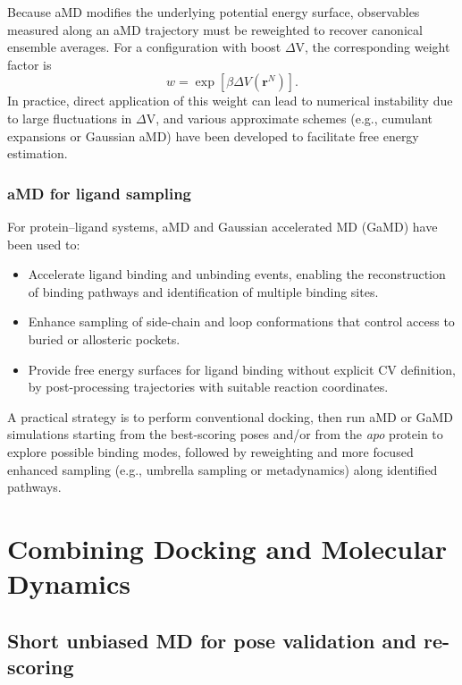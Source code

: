\documentclass[12pt]{article}
\begin{document}
Because aMD modifies the underlying potential energy surface, observables measured along an aMD trajectory must be reweighted to recover canonical ensemble averages. For a configuration with boost $\Delta \textrm{V}$, the corresponding weight factor is
\begin{equation}
w = \exp\left[\beta \Delta V(\mathbf{r}^N)\right].
\end{equation}
In practice, direct application of this weight can lead to numerical instability due to large fluctuations in $\Delta \textrm{V}$, and various approximate schemes (e.g., cumulant expansions or Gaussian aMD) have been developed to facilitate free energy estimation\cite{CH9_Miao2015}.

\subsubsection{aMD for ligand sampling}

For protein--ligand systems, aMD and Gaussian accelerated MD (GaMD)\cite{CH9_Miao2015,CH9_Markwick2011} have been used to:

\begin{itemize}
\item Accelerate ligand binding and unbinding events, enabling the reconstruction of binding pathways and identification of multiple binding sites.
\item Enhance sampling of side-chain and loop conformations that control access to buried or allosteric pockets.
\item Provide free energy surfaces for ligand binding without explicit CV definition, by post-processing trajectories with suitable reaction coordinates.
\end{itemize}

A practical strategy is to perform conventional docking, then run aMD or GaMD simulations starting from the best-scoring poses and/or from the \textit{apo} protein to explore possible binding modes, followed by reweighting and more focused enhanced sampling (e.g., umbrella sampling or metadynamics) along identified pathways.

\section{Combining Docking and Molecular Dynamics}

\subsection{Short unbiased MD for pose validation and re-scoring}
\end{document}
